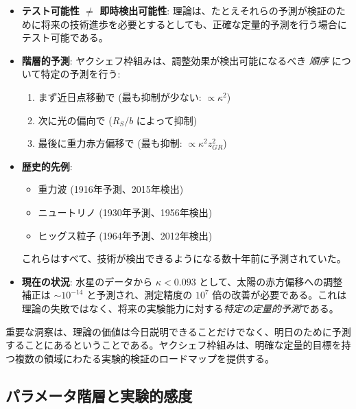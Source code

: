 \documentclass[11pt,a4paper]{article}
\begin{document}
	\begin{itemize}
		\item \textbf{テスト可能性 $\neq$ 即時検出可能性}: 理論は、たとえそれらの予測が検証のために将来の技術進歩を必要とするとしても、正確な定量的予測を行う場合にテスト可能である。
		
		\item \textbf{階層的予測}: ヤクシェフ枠組みは、調整効果が検出可能になるべき \emph{順序} について特定の予測を行う:
		\begin{enumerate}
			\item まず近日点移動で (最も抑制が少ない: $\propto \kappa^2$)
			\item 次に光の偏向で ($R_S/b$ によって抑制)
			\item 最後に重力赤方偏移で (最も抑制: $\propto \kappa^2 z_{GR}^2$)
		\end{enumerate}
		
		\item \textbf{歴史的先例}:
		\begin{itemize}
			\item 重力波 (1916年予測、2015年検出)
			\item ニュートリノ (1930年予測、1956年検出)
			\item ヒッグス粒子 (1964年予測、2012年検出)
		\end{itemize}
		これらはすべて、技術が検出できるようになる数十年前に予測されていた。
		
		\item \textbf{現在の状況}: 水星のデータから $\kappa < 0.093$ として、太陽の赤方偏移への調整補正は $\sim 10^{-14}$ と予測され、測定精度の $10^7$ 倍の改善が必要である。これは理論の失敗ではなく、将来の実験能力に対する\emph{特定の定量的予測}である。
	\end{itemize}
	
	重要な洞察は、理論の価値は今日説明できることだけでなく、明日のために予測することにあるということである。ヤクシェフ枠組みは、明確な定量的目標を持つ複数の領域にわたる実験的検証のロードマップを提供する。
	
	\subsection{パラメータ階層と実験的感度}
	
\end{document}
